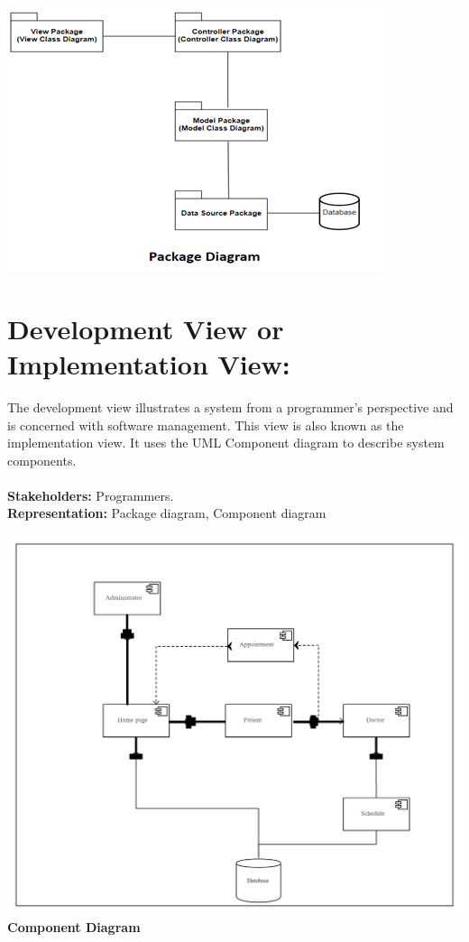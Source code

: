 \documentclass[a4paper,12pt]{report}
\begin{document}
\begin{center}
    \includegraphics{UML/package.png}    
\end{center}

\section*{Development View or Implementation View:}
The development view illustrates a system from a programmer's perspective and is concerned with software management. This view is also known as the implementation view. It uses the UML Component diagram to describe system components.\\\\
\textbf{Stakeholders:} Programmers.\\
\textbf{Representation:} Package diagram, Component diagram

\begin{center}
    \includegraphics[scale=0.15]{UML/component.png}\\
    \textbf{Component Diagram}
\end{center}
\end{document}
